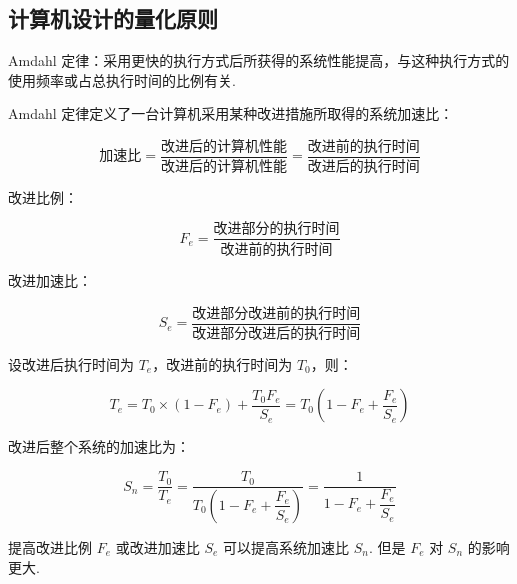 \documentclass[cn, hazy, blue, normal, 12pt]{elegantnote}
\begin{document}
\subsection{计算机设计的量化原则}

Amdahl 定律：采用更快的执行方式后所获得的系统性能提高，与这种执行方式的使用频率或占总执行时间的比例有关.

Amdahl 定律定义了一台计算机采用某种改进措施所取得的系统加速比：

$$
    \text{加速比} = \dfrac{\text{改进后的计算机性能}}{\text{改进后的计算机性能}} = \dfrac{\text{改进前的执行时间}}{\text{改进后的执行时间}}
$$

改进比例：

$$
    F_e = \dfrac{\text{改进部分的执行时间}}{\text{改进前的执行时间}}
$$

改进加速比：

$$
    S_e = \dfrac{\text{改进部分改进前的执行时间}}{\text{改进部分改进后的执行时间}}
$$

设改进后执行时间为 $T_e$，改进前的执行时间为 $T_0$，则：

$$
    T_e = T_0 \times (1 - F_e) + \dfrac{T_0 F_e}{S_e} = T_0 \left(1 - F_e + \dfrac{F_e}{S_e}\right)
$$

改进后整个系统的加速比为：

$$
    S_n = \dfrac{T_0}{T_e} = \dfrac{T_0}{T_0 \left(1 - F_e + \dfrac{F_e}{S_e}\right)} = \dfrac{1}{1 - F_e + \dfrac{F_e}{S_e}}
$$

提高改进比例 $F_e$ 或改进加速比 $S_e$ 可以提高系统加速比 $S_n$. 但是 $F_e$ 对 $S_n$ 的影响更大.
\end{document}
